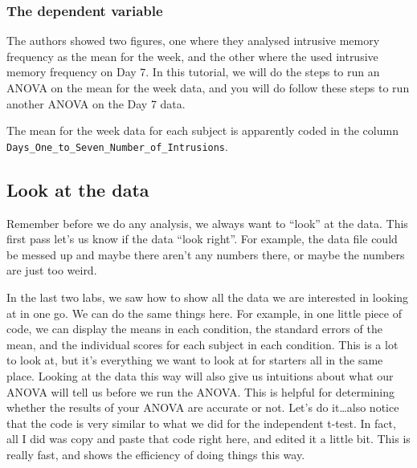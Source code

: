 \documentclass[]{book}
\theoremstyle{definition}
\theoremstyle{definition}
\theoremstyle{definition}
\theoremstyle{remark}
\begin{document}
\subsubsection{The dependent variable}\label{the-dependent-variable}

The authors showed two figures, one where they analysed intrusive memory
frequency as the mean for the week, and the other where the used
intrusive memory frequency on Day 7. In this tutorial, we will do the
steps to run an ANOVA on the mean for the week data, and you will do
follow these steps to run another ANOVA on the Day 7 data.

The mean for the week data for each subject is apparently coded in the
column \texttt{Days\_One\_to\_Seven\_Number\_of\_Intrusions}.

\subsection{Look at the data}\label{look-at-the-data-2}

Remember before we do any analysis, we always want to ``look'' at the
data. This first pass let's us know if the data ``look right''. For
example, the data file could be messed up and maybe there aren't any
numbers there, or maybe the numbers are just too weird.

In the last two labs, we saw how to show all the data we are interested
in looking at in one go. We can do the same things here. For example, in
one little piece of code, we can display the means in each condition,
the standard errors of the mean, and the individual scores for each
subject in each condition. This is a lot to look at, but it's everything
we want to look at for starters all in the same place. Looking at the
data this way will also give us intuitions about what our ANOVA will
tell us before we run the ANOVA. This is helpful for determining whether
the results of your ANOVA are accurate or not. Let's do it\ldots{}also
notice that the code is very similar to what we did for the independent
t-test. In fact, all I did was copy and paste that code right here, and
edited it a little bit. This is really fast, and shows the efficiency of
doing things this way.
\end{document}
